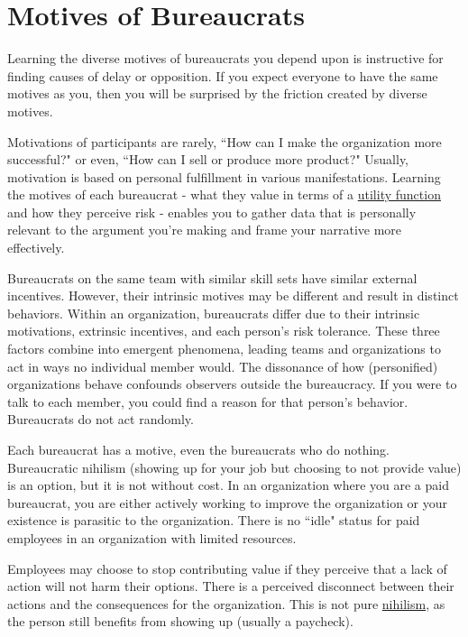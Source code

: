 \section{Motives of Bureaucrats\label{sec:motivations}}

Learning the diverse motives of bureaucrats you depend upon is instructive for finding causes of delay or opposition. If you expect everyone to have the same motives as you, then you will be surprised by the friction created by diverse motives. 

Motivations of participants are rarely, ``How can I make the organization more successful?" or even, ``How can I sell or produce more product?" Usually, motivation is based on personal fulfillment in various manifestations. Learning the motives of each bureaucrat - what they value in terms of a \href{https://en.wikipedia.org/wiki/Utility}{utility function}
and how they perceive risk - enables you to gather data that is personally relevant to the argument you're making and frame your narrative more effectively.


Bureaucrats on the same team with similar skill sets have similar external incentives. However, their intrinsic motives may be different and result in distinct behaviors. Within an organization, bureaucrats differ due to their intrinsic motivations,  extrinsic incentives, and each person's risk tolerance. These three factors combine into emergent phenomena, leading teams and organizations to act in ways no individual member would. The dissonance of how (personified) organizations behave confounds observers outside the bureaucracy. If you were to talk to each member, you could find a reason for that person's behavior. Bureaucrats do not act randomly.



Each bureaucrat has a motive, even the bureaucrats who do nothing. Bureaucratic nihilism (showing up for your job but choosing to not provide value) is an option, but it is not without cost.
In an organization where you are a paid bureaucrat, you are either actively working to improve the organization or your existence is parasitic to the organization. There is no ``idle" status for paid employees in an organization with limited resources.

Employees may choose to stop contributing value if they perceive that a lack of action will not harm their options. There is a perceived disconnect between their actions and the consequences for the organization. This is not pure \href{https://en.wikipedia.org/wiki/Nihilism}{nihilism}, 
as the person still  benefits from showing up (usually a paycheck).

